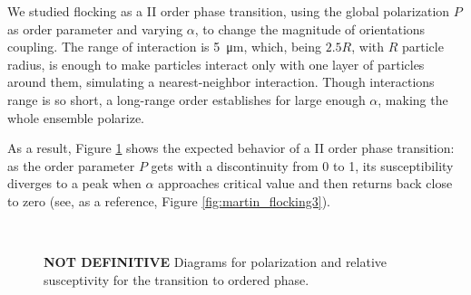 \documentclass[../../master_thesis_np.tex]{subfiles}
\begin{document}
		We studied flocking as a II order phase transition, using the global polarization $P$ as order parameter and varying $\alpha$, to change the magnitude of orientations coupling. 
		The range of interaction is \SI{5}{\micro\meter}, which, being $2.5R$, with $R$ particle radius, is enough to make particles interact only with one layer of particles around them, simulating a nearest-neighbor interaction. 
		Though interactions range is so short, a long-range order establishes for large enough $\alpha$, making the whole ensemble polarize.
		
		As a result, Figure \ref{fig:phasetrans} shows the expected behavior of a II order phase transition: as the order parameter $P$ gets with a discontinuity from 0 to 1, its susceptibility diverges to a peak when $\alpha$ approaches critical value and then returns back close to zero (see, as a reference, Figure \ref{fig:martin_flocking3}).
		
		\begin{figure}[htp]
			\centering
			\\
			\caption{\textbf{NOT DEFINITIVE} Diagrams for polarization and relative susceptivity for the transition to ordered phase.}
			\label{fig:phasetrans}
		\end{figure}
		
\end{document}
